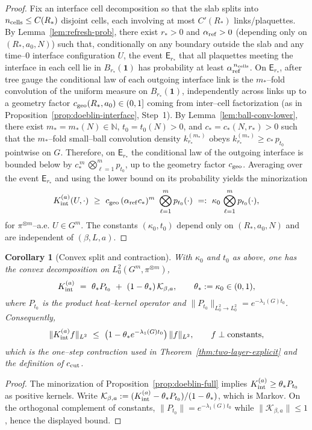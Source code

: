 \documentclass[11pt]{amsart}
\theoremstyle{plain}
\newtheorem{corollary}[theorem]{Corollary}
\theoremstyle{definition}
\theoremstyle{remark}
\begin{document}
\begin{proof}
Fix an interface cell decomposition so that the slab splits into $n_{\rm cells}\le C(R_*)$ disjoint cells, each involving at most $C'(R_*)$ links/plaquettes. By Lemma~\ref{lem:refresh-prob}, there exist $r_*>0$ and $\alpha_{\rm ref}>0$ (depending only on $(R_*,a_0,N)$) such that, conditionally on any boundary outside the slab and any time–$0$ interface configuration $U$, the event $\mathsf E_{r_*}$ that all plaquettes meeting the interface in each cell lie in $B_{r_*}(\mathbf 1)$ has probability at least $\alpha_{\rm ref}^{\,n_{\rm cells}}$. On $\mathsf E_{r_*}$, after tree gauge the conditional law of each outgoing interface link is the $m_*$–fold convolution of the uniform measure on $B_{r_*}(\mathbf 1)$, independently across links up to a geometry factor $c_{\rm geo}(R_*,a_0)\in(0,1]$ coming from inter–cell factorization (as in Proposition~\ref{prop:doeblin-interface}, Step~1). By Lemma~\ref{lem:ball-conv-lower}, there exist $m_*=m_*(N)\in\mathbb N$, $t_0=t_0(N)>0$, and $c_*=c_*(N,r_*)>0$ such that the $m_*$–fold small–ball convolution density $k_{r_*}^{(m_*)}$ obeys $k_{r_*}^{(m_*)}\ge c_*\,p_{t_0}$ pointwise on $G$. Therefore, on $\mathsf E_{r_*}$ the conditional law of the outgoing interface is bounded below by $c_*^{\,m}\,\bigotimes_{\ell=1}^m p_{t_0}$, up to the geometry factor $c_{\rm geo}$. Averaging over the event $\mathsf E_{r_*}$ and using the lower bound on its probability yields the minorization
\[
  K_{\rm int}^{(a)}(U,\cdot)\ \ge\ c_{\rm geo}\, (\alpha_{\rm ref} c_*)^{m}\ \bigotimes_{\ell=1}^m p_{t_0}(\cdot)\ =:\ \kappa_0\, \bigotimes_{\ell=1}^m p_{t_0}(\cdot),
\]
for $\pi^{\otimes m}$–a.e. $U\in G^m$. The constants $(\kappa_0,t_0)$ depend only on $(R_*,a_0,N)$ and are independent of $(\beta,L,a)$.
\end{proof}

\begin{corollary}[Convex split and contraction]\label{cor:convex-split}
With $\kappa_0$ and $t_0$ as above, one has the convex decomposition on $L^2_0(G^m,\pi^{\otimes m})$,
\[
  K_{\rm int}^{(a)}\ =\ \theta_* P_{t_0}\ +\ (1-\theta_*)\,\mathcal{K}_{\beta,a},\qquad \theta_*:=\kappa_0\in(0,1),
\]
where $P_{t_0}$ is the product heat--kernel operator and $\|P_{t_0}\|_{L^2_0\to L^2_0}=e^{-\lambda_1(G) t_0}$. Consequently,
\[
  \|K_{\rm int}^{(a)} f\|_{L^2}\ \le\ \big(1-\theta_* e^{-\lambda_1(G) t_0}\big)\,\|f\|_{L^2},\qquad f\perp \text{constants},
\]
which is the one--step contraction used in Theorem~\ref{thm:two-layer-explicit} and the definition of $c_{\rm cut}$.
\end{corollary}
\begin{proof}
The minorization of Proposition~\ref{prop:doeblin-full} implies $K_{\rm int}^{(a)}\ge \theta_* P_{t_0}$ as positive kernels. Write $\mathcal{K}_{\beta,a}:=(K_{\rm int}^{(a)}-\theta_* P_{t_0})/(1-\theta_*)$, which is Markov. On the orthogonal complement of constants, $\|P_{t_0}\|=e^{-\lambda_1(G) t_0}$ while $\|\mathcal{K}_{\beta,a}\|\le 1$, hence the displayed bound.
\end{proof}
\end{document}
